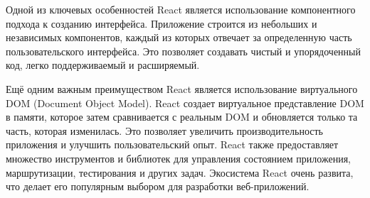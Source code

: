 Одной из ключевых особенностей React является использование компонентного подхода к созданию интерфейса. Приложение строится из небольших и независимых компонентов, каждый из которых отвечает за определенную часть пользовательского интерфейса. Это позволяет создавать чистый и упорядоченный код, легко поддерживаемый и расширяемый.

Ещё одним важным преимуществом React является использование виртуального DOM (Document Object Model). React создает виртуальное представление DOM в памяти, которое затем сравнивается с реальным DOM и обновляется только та часть, которая изменилась. Это позволяет увеличить производительность приложения и улучшить пользовательский опыт.
React также предоставляет множество инструментов и библиотек для управления состоянием приложения, маршрутизации, тестирования и других задач. Экосистема React очень развита, что делает его популярным выбором для разработки веб-приложений.


